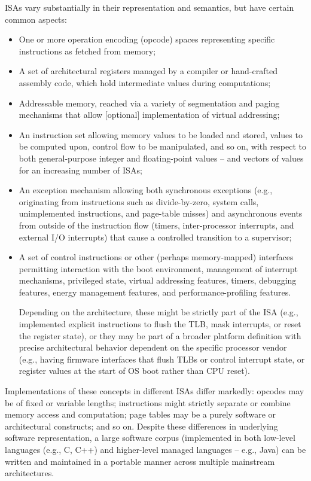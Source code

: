 ISAs vary substantially in their representation and semantics, but have
certain common aspects:

\begin{itemize}
\item One or more operation encoding (opcode) spaces representing specific
  instructions as fetched from memory;
\item A set of architectural registers managed by a compiler or hand-crafted
  assembly code, which hold intermediate values during computations;
\item Addressable memory, reached via a variety of segmentation and paging
  mechanisms that allow [optional] implementation of virtual addressing;
\item An instruction set allowing memory values to be loaded and stored,
  values to be computed upon, control flow to be manipulated, and so on,
  with respect to both general-purpose integer and floating-point values -- and
  vectors of values for an increasing number of ISAs;
\item An exception mechanism allowing both synchronous exceptions (e.g.,
  originating from instructions such as divide-by-zero, system calls,
  unimplemented instructions, and page-table misses) and asynchronous events
  from outside of the instruction flow (timers, inter-processor interrupts,
  and external I/O interrupts) that cause a controlled transition to a
  supervisor;
\item A set of control instructions or other (perhaps memory-mapped)
  interfaces permitting interaction with the boot environment, management of
  interrupt mechanisms, privileged state, virtual addressing features, timers,
  debugging features, energy management features, and performance-profiling
  features.

  Depending on the architecture, these might be strictly part of the ISA
  (e.g., implemented explicit instructions to flush the TLB, mask
  interrupts, or reset the register state), or they may be part of a broader
  platform definition with precise architectural behavior dependent on the
  specific processor vendor (e.g., having firmware interfaces that flush TLBs
  or control interrupt state, or register values at the start of OS boot
  rather than CPU reset).
\end{itemize}

Implementations of these concepts in different ISAs differ markedly: opcodes
may be of fixed or variable lengths; instructions might strictly separate or
combine memory access and computation; page tables may be a purely software
or architectural constructs; and so on.  Despite these differences in
underlying software representation, a large software corpus (implemented in
both low-level languages (e.g., C, C++) and higher-level managed languages
-- e.g., Java) can be written and maintained in a portable manner across
multiple mainstream architectures.

